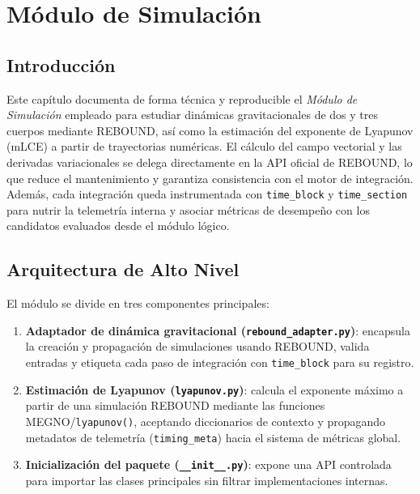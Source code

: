 
\section{Módulo de Simulación}%
\label{cap:bitacora-implementacion}

\subsection{Introducción}
Este capítulo documenta de forma técnica y reproducible el \emph{Módulo de Simulación} empleado para estudiar dinámicas gravitacionales de dos y tres cuerpos mediante REBOUND, así como la estimación del exponente de Lyapunov (mLCE) a partir de trayectorias numéricas. El cálculo del campo vectorial y las derivadas variacionales se delega directamente en la API oficial de REBOUND, lo que reduce el mantenimiento y garantiza consistencia con el motor de integración. Además, cada integración queda instrumentada con \texttt{time\_block} y \texttt{time\_section} para nutrir la telemetría interna y asociar métricas de desempeño con los candidatos evaluados desde el módulo lógico.\\

\subsection{Arquitectura de Alto Nivel}
El módulo se divide en tres componentes principales:\\
\begin{enumerate}
    \item \textbf{Adaptador de dinámica gravitacional (\texttt{rebound\_adapter.py})}: encapsula la creación y propagación de simulaciones usando REBOUND, valida entradas y etiqueta cada paso de integración con \texttt{time\_block} para su registro.
    \item \textbf{Estimación de Lyapunov (\texttt{lyapunov.py})}: calcula el exponente máximo a partir de una simulación REBOUND mediante las funciones MEGNO/\texttt{lyapunov()}, aceptando diccionarios de contexto y propagando metadatos de telemetría (\texttt{timing\_meta}) hacia el sistema de métricas global.
    \item \textbf{Inicialización del paquete (\texttt{\_\_init\_\_.py})}: expone una API controlada para importar las clases principales sin filtrar implementaciones internas.
\end{enumerate}

